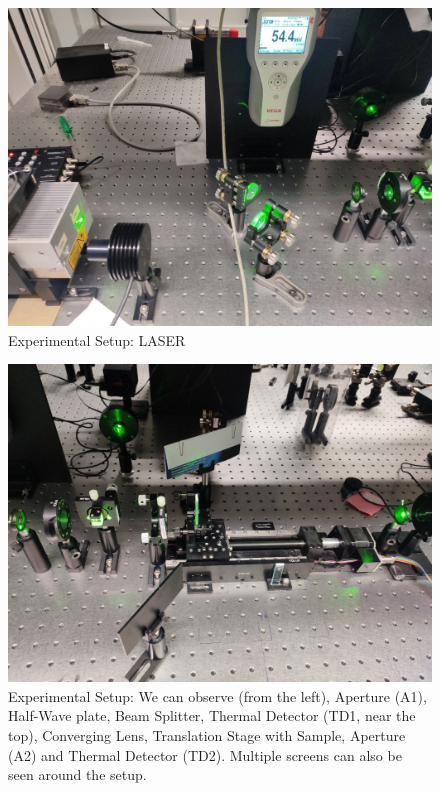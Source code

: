 \documentclass[%
 reprint,
amsmath,
amssymb,
10pt
]{revtex4-2}
\begin{document}
\begin{figure}
    \centering
    \includegraphics[width=0.9\linewidth]{images/laser.jpg}
    \caption{Experimental Setup: LASER}
    \label{fig:laser}
\end{figure}
\begin{figure}
    \centering
    \includegraphics[width=0.9\linewidth]{images/else.jpg}
    \captionsetup{width=0.4\textwidth}
    \caption{Experimental Setup: We can observe (from the left), Aperture (A1), Half-Wave plate, Beam Splitter, Thermal Detector (TD1, near the top), Converging Lens, Translation Stage with Sample, Aperture (A2) and Thermal Detector (TD2). Multiple screens can also be seen around the setup.}
    \label{fig:else}
\end{figure}
\end{document}

